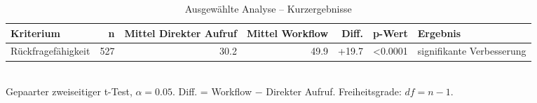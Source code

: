 \begin{table}[htbp]
\centering
\caption{Ausgewählte Analyse -- Kurzergebnisse}
\begin{tabular}{lrrrrrl}
\toprule
Kriterium & n & Mittel Direkter Aufruf & Mittel Workflow & Diff. & p-Wert & Ergebnis \\
\midrule
Rückfragefähigkeit & 527 & 30.2 & 49.9 & +19.7 & <0.0001 & signifikante Verbesserung \\
\bottomrule
\end{tabular}
\\[2mm]
\footnotesize Gepaarter zweiseitiger t-Test, $\alpha=0.05$. Diff. = Workflow $-$ Direkter Aufruf. Freiheitsgrade: $df=n-1$.
\end{table}
